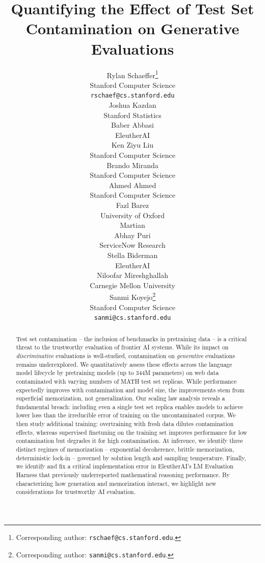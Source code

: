 \documentclass{article}
\title{Quantifying the Effect of Test Set Contamination on Generative Evaluations}
\author{%
  Rylan Schaeffer\thanks{Corresponding author: \texttt{rschaef@cs.stanford.edu}.} \\
  Stanford Computer Science \\
  \texttt{rschaef@cs.stanford.edu} \\
  \And
  Joshua Kazdan \\
  Stanford Statistics \\
  \And
  Baber Abbasi \\
  EleutherAI \\
  \And
  Ken Ziyu Liu \\
  Stanford Computer Science \\
  \And
  Brando Miranda \\
  Stanford Computer Science \\
  \And
  Ahmed Ahmed \\
  Stanford Computer Science \\
  \AND
  Fazl Barez \\
  University of Oxford \\
  Martian \\
  \And
  Abhay Puri \\
  ServiceNow Research \\
  \And
  Stella Biderman \\
  EleutherAI \\
  \And
  Niloofar Mireshghallah \\
  Carnegie Mellon University \\
  \And
  Sanmi Koyejo\thanks{Corresponding author: \texttt{sanmi@cs.stanford.edu}.} \\
  Stanford Computer Science \\
  \texttt{sanmi@cs.stanford.edu} \\
}
\theoremstyle{plain}
\theoremstyle{definition}
\theoremstyle{remark}
\begin{document}
\maketitle


\begin{abstract}
    Test set contamination -- the inclusion of benchmarks in pretraining data -- is a critical threat to the trustworthy evaluation of frontier AI systems.
    While its impact on \emph{discriminative} evaluations is well-studied, contamination on \emph{generative} evaluations remains underexplored.
    We quantitatively assess these effects across the language model lifecycle by pretraining models (up to 344M parameters) on web data contaminated with varying numbers of MATH test set replicas.
    While performance expectedly improves with contamination and model size, the improvements stem from superficial memorization, not generalization.
    Our scaling law analysis reveals a fundamental breach: including even a single test set replica enables models to achieve lower loss than the irreducible error of training on the uncontaminated corpus.
    We then study additional training: overtraining with fresh data dilutes contamination effects, whereas supervised finetuning on the training set improves performance for low contamination but degrades it for high contamination.
    At inference, we identify three distinct regimes of memorization -- exponential decoherence, brittle memorization, deterministic lock-in -- governed by solution length and sampling temperature.
    Finally, we identify and fix a critical implementation error in EleutherAI's LM Evaluation Harness that previously underreported mathematical reasoning performance. By characterizing how generation and memorization interact, we highlight new considerations for trustworthy AI evaluation.
\end{abstract}

















\appendix







\newpage

\end{document}
